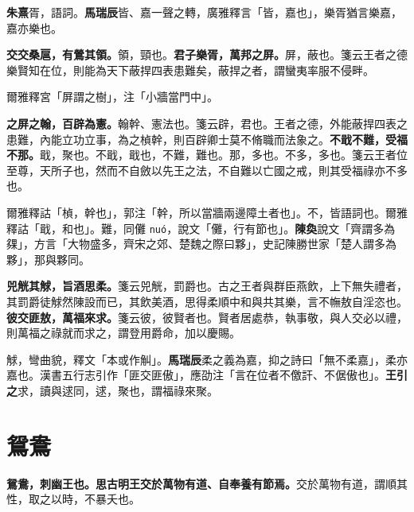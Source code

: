 \begin{quoting}\textbf{朱熹}胥，語詞。\textbf{馬瑞辰}皆、嘉一聲之轉，廣雅釋言「皆，嘉也」，樂胥猶言樂嘉，嘉亦樂也。\end{quoting}

\textbf{交交桑扈，有鶯其領。}{\footnotesize 領，頸也。}\textbf{君子樂胥，萬邦之屏。}{\footnotesize 屏，蔽也。箋云王者之德樂賢知在位，則能為天下蔽捍四表患難矣，蔽捍之者，謂蠻夷率服不侵畔。}

\begin{quoting}爾雅釋宮「屏謂之樹」，注「小牆當門中」。\end{quoting}

\textbf{之屏之翰，百辟為憲。}{\footnotesize 翰幹、憲法也。箋云辟，君也。王者之德，外能蔽捍四表之患難，內能立功立事，為之楨幹，則百辟卿士莫不脩職而法象之。}\textbf{不戢不難，受福不那。}{\footnotesize 戢，聚也。不戢，戢也，不難，難也。那，多也。不多，多也。箋云王者位至尊，天所子也，然而不自斂以先王之法，不自難以亡國之戒，則其受福祿亦不多也。}

\begin{quoting}爾雅釋詁「楨，幹也」，郭注「幹，所以當牆兩邊障土者也」。不，皆語詞也。爾雅釋詁「戢，和也」。難，同儺 \texttt{nuó}，說文「儺，行有節也」。\textbf{陳奐}說文「齊謂多為㚌」，方言「大物盛多，齊宋之郊、楚魏之際曰夥」，史記陳勝世家「楚人謂多為夥」，那與夥同。\end{quoting}

\textbf{兕觥其觩，旨酒思柔。}{\footnotesize 箋云兕觥，罰爵也。古之王者與群臣燕飲，上下無失禮者，其罰爵徒觩然陳設而已，其飲美酒，思得柔順中和與共其樂，言不幠敖自淫恣也。}\textbf{彼交匪敖，萬福來求。}{\footnotesize 箋云彼，彼賢者也。賢者居處恭，執事敬，與人交必以禮，則萬福之祿就而求之，謂登用爵命，加以慶賜。}

\begin{quoting}觩，彎曲貌，釋文「本或作觓」。\textbf{馬瑞辰}柔之義為嘉，抑之詩曰「無不柔嘉」，柔亦嘉也。漢書五行志引作「匪交匪傲」，應劭注「言在位者不儌訐、不倨傲也」。\textbf{王引之}求，讀與逑同，逑，聚也，謂福祿來聚。\end{quoting}

\section{鴛鴦}


\textbf{鴛鴦，刺幽王也。思古明王交於萬物有道、自奉養有節焉。}{\footnotesize 交於萬物有道，謂順其性，取之以時，不暴夭也。}

